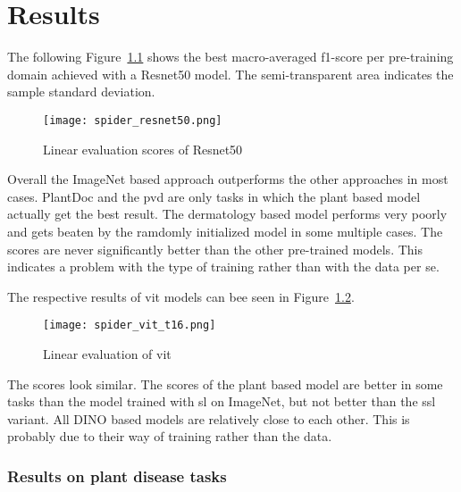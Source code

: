\chapter{Results}\label{chapter_4}

The following Figure~\ref{fig:spider_resnet50} shows the best macro-averaged f1-score per pre-training domain achieved with a Resnet50 model. 
The semi-transparent area indicates the sample standard deviation.

\begin{figure}[H]
    \begin{center}
    \texttt{[image: spider\_resnet50.png]}
    \caption{Linear evaluation scores of Resnet50}\label{fig:spider_resnet50}
    \end{center}
\end{figure}

Overall the ImageNet based approach outperforms the other approaches in most cases.
PlantDoc and the \gls{pvd} are only tasks in which the plant based model actually get the best result.
The dermatology based model performs very poorly and gets beaten by the ramdomly initialized model in some multiple cases.
The scores are never significantly better than the other pre-trained models. 
This indicates a problem with the type of training rather than with the data per se.

The respective results of \gls{vit} models can bee seen in Figure~\ref{fig:spider_vit_t16}.

\begin{figure}[H]
    \begin{center}
    \texttt{[image: spider\_vit\_t16.png]}
    \caption{Linear evaluation of \gls{vit}}\label{fig:spider_vit_t16}
    \end{center}
\end{figure}

The scores look similar. 
The scores of the plant based model are better in some tasks than the model trained with \gls{sl} on ImageNet, but not better than the \gls{ssl} variant. 
All DINO based models are relatively close to each other. 
This is probably due to their way of training rather than the data.

\subsection{Results on plant disease tasks}

